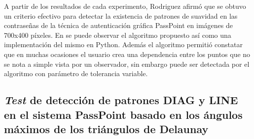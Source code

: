 \documentclass[12pt]{report}
\begin{document}
A partir de los resultados de cada experimento, Rodriguez afirmó que se obtuvo un criterio efectivo para detectar la existencia de patrones de suavidad en las contraseñas de la técnica de autenticación gráfica PassPoint en imágenes de 700x400 píxeles. En \cite{3} se puede observar el algoritmo propuesto así como una implementación del mismo en Python. Además el algoritmo permitió constatar que en muchas ocasiones el usuario crea una dependencia entre los puntos que no se nota a simple vista por un observador, sin embargo puede ser detectada por el algoritmo con parámetro de tolerancia variable.


\subsection{\textit{Test} de detección de patrones DIAG y LINE en el sistema PassPoint basado en los ángulos máximos de los triángulos de Delaunay  }




\end{document}
